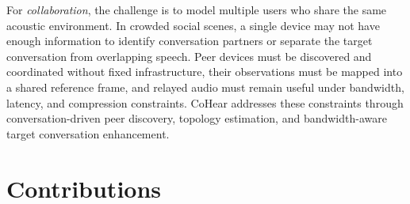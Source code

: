 For \textit{collaboration}, the challenge is to model multiple users who share the same acoustic environment. In crowded social scenes, a single device may not have enough information to identify conversation partners or separate the target conversation from overlapping speech. Peer devices must be discovered and coordinated without fixed infrastructure, their observations must be mapped into a shared reference frame, and relayed audio must remain useful under bandwidth, latency, and compression constraints. CoHear addresses these constraints through conversation-driven peer discovery, topology estimation, and bandwidth-aware target conversation enhancement.

\section{Contributions}

